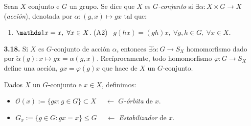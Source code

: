 \begin{definition}
    Sean \(X\) conjunto e \(G\) un grupo. Se dice que \(X\) es \(G\)\emph{-conjunto} si \(\exists \alpha: X \times G \to X\) (\emph{acción}), denotada por \(\alpha: (g,x) \mapsto gx\) tal que: 
    \vspace{-0.2cm}
    \begin{enumerate}[label = (A\arabic*), left = 1.2cm]
        \item \(\id x = x, \ \forall x \in X\). \hfill (A2) \ \(g(hx) = (gh)x, \ \forall g,h \in G, \ \forall x \in X\).  \hspace{0.5cm} \-
    \end{enumerate}
\end{definition}


\hypertarget{thm318}{}
\begin{theorem}
    \textbf{3.18.} Si \(X\) es \(G\)-conjunto de acción \(\alpha\), entonces \(\exists \widetilde{\alpha} : G \to S_X\) homomorfismo dado por \(\widetilde{\alpha}(g):x \mapsto gx = \alpha(g,x) \). Recíprocamente, todo homomorfismo \(\varphi: G \to S_X\) define una acción, \(gx = \varphi(g) x\) que hace de \(X\) un \(G\)-conjunto.  
\end{theorem}

\begin{definition}
    Dados \(X\) un \(G\)-conjunto e \(x \in X\), definimos: 
    \vspace{-0.2cm}
    \begin{itemize}[label = \(\star\), left = 1cm]
        \item \(\mathcal{O}(x) := \{gx : g\in G \} \subset X\)  \ \ \(\leftarrow\) \emph{\(G\)-órbita} de \(x\).
        \item \(G_x := \{g \in G: gx = x\} \leq G \)  \ \ \(\leftarrow\) \emph{Estabilizador} de \(x\).
    \end{itemize}
\end{definition}



